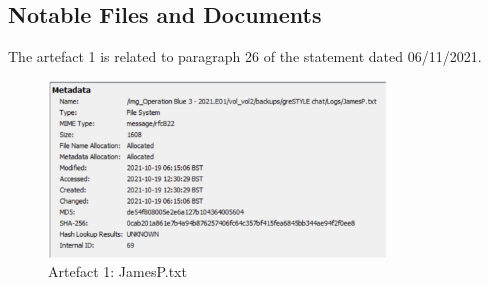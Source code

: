 \subsection{Notable Files and Documents}
\label{s:evidential-extraction-document-notable-files-and-documents}
The artefact 1 is related to paragraph 26 of the statement dated 06/11/2021.
\begin{figure}[H]
  \centering
  \includegraphics[width=0.8\textwidth]{figures/meta1}
  \caption{Artefact 1: JamesP.txt}
  \label{f:meta1}
\end{figure}
